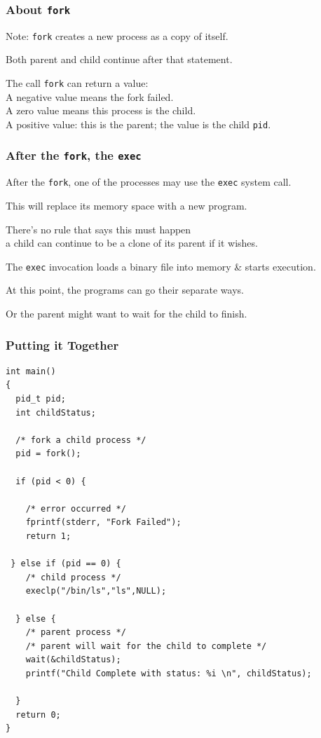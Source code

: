 \begin{frame}
\frametitle{About \texttt{fork}}

Note: \texttt{fork} creates a new process as a copy of itself.

Both parent and child continue after that statement.

The call \texttt{fork} can return a value:\\
\quad A negative value means the fork failed.\\
\quad A zero value means this process is the child.\\
\quad A positive value: this is the parent; the value is the child \texttt{pid}.

\end{frame}

\begin{frame}
\frametitle{After the \texttt{fork}, the \texttt{exec}}


After the \texttt{fork}, one of the processes may use the \texttt{exec} system call.

This will replace its memory space with a new program. 

There's no rule that says this must happen\\
\quad a child can continue to be a clone of its parent if it wishes.

The \texttt{exec} invocation loads a binary file into memory \& starts execution. 

At this point, the programs can go their separate ways.

Or the parent might want to wait for the child to finish.


\end{frame}

\begin{frame}[fragile]
\frametitle{Putting it Together}

{\scriptsize
\begin{verbatim}
int main()
{
  pid_t pid;
  int childStatus;

  /* fork a child process */
  pid = fork();
  
  if (pid < 0) { 
  
    /* error occurred */ 
    fprintf(stderr, "Fork Failed"); 
    return 1;
    
 } else if (pid == 0) { 
    /* child process */
    execlp("/bin/ls","ls",NULL);
    
  } else { 
    /* parent process */
    /* parent will wait for the child to complete */
    wait(&childStatus);
    printf("Child Complete with status: %i \n", childStatus);
    
  }
  return 0;
}
\end{verbatim}
}

\end{frame}

